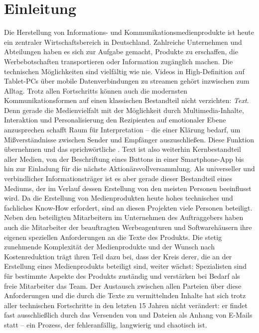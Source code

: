 \section{Einleitung}

Die Herstellung von Informations- und Kommunikationsmedienprodukte ist heute ein zentraler Wirtschaftsbereich in Deutschland. Zahlreiche Unternehmen und Abteilungen haben es sich zur Aufgabe gemacht, Produkte zu erschaffen, die Werbebotschaften transportieren oder Information zugänglich machen. Die technischen Möglichkeiten sind vielfältig wie nie. Videos in High-Definition auf Tablet-PCs über mobile Datenverbindungen zu streamen gehört inzwischen zum Alltag. Trotz allen Fortschritts können auch die modernsten Kommunikationsformen auf einen klassischen Bestandteil nicht verzichten: \emph{Text}. Denn gerade die Medienvielfalt mit der Möglichkeit durch Multimedia-Inhalte, Interaktion und Personalisierung den Rezipienten auf emotionaler Ebene anzusprechen schafft Raum für Interpretation -- die einer Klärung bedarf, um Mißverständnisse zwischen Sender und Empfänger auszuschließen. Diese Funktion übernehmen  und das sprichwörtliche . Text ist also weiterhin Kernbestandteil aller Medien, von der Beschriftung eines Buttons in einer Smartphone-App bis hin zur Einladung für die nächste Aktionärsvollversammlung. Als universeller und verbindlicher Informationsträger ist es aber gerade dieser Bestandteil eines Mediums, der im Verlauf dessen Erstellung von den meisten Personen beeinflusst wird. Da die Erstellung von Medienprodukten heute hohes technisches und fachliches Know-How erfordert, sind an diesen Projekten viele Personen beteiligt. Neben den beteiligten Mitarbeitern im Unternehmen des Auftraggebers haben auch die Mitarbeiter der beauftragten Werbeagenturen und Softwarehäusern ihre eigenen speziellen Anforderungen an die Texte des Produkts. Die stetig zunehmende Komplexität der Medienprodukte und der Wunsch nach Kostenreduktion trägt ihren Teil dazu bei, dass der Kreis derer, die an der Erstellung eines Medienprodukts beteiligt sind, weiter wächst: Spezialisten sind für bestimmte Aspekte des Produkts zuständig und verstärken bei Bedarf als freie Mitarbeiter das Team. Der Austausch zwischen allen Parteien über diese Anforderungen und die durch die Texte zu vermittelnden Inhalte hat sich trotz aller technischen Fortschritte in den letzten 15 Jahren nicht verändert: er findet fast ausschließlich durch das Versenden von  und Dateien als Anhang von E-Mails statt -- ein Prozess, der fehleranfällig, langwierig und chaotisch ist. 

